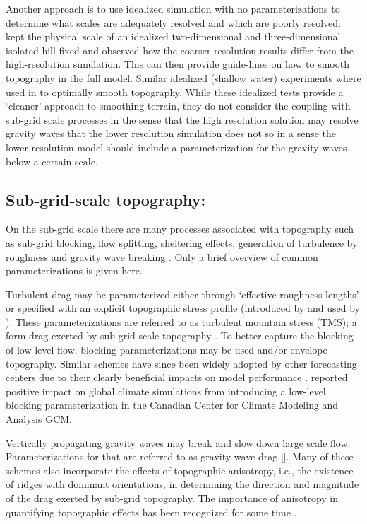\documentclass[gmd]{copernicus}
\begin{document}
Another approach is to use idealized simulation with no parameterizations to determine what scales are adequately resolved and which are poorly resolved. \cite{DB2001QJRMS} kept the physical scale of an idealized two-dimensional and three-dimensional isolated hill fixed and observed how the coarser resolution results differ from the high-resolution simulation. This can then provide guide-lines on how to smooth topography in the full model. Similar idealized (shallow water) experiments where used in \cite{RTS2006QJRMS} to optimally smooth topography. While these idealized tests provide a `cleaner' approach to smoothing terrain, they do not consider the coupling with sub-grid scale processes in the sense that the high resolution solution may resolve gravity waves that the lower resolution simulation does not so in a sense the lower resolution model should include a parameterization for the gravity waves below a certain scale.
%
\subsection{Sub-grid-scale topography: }
On the sub-grid scale there are many processes associated with topography such as sub-grid blocking, flow splitting, sheltering effects, generation of turbulence by roughness and gravity wave breaking \citep{B1990BAMS}. Only a brief overview of common parameterizations is given here.

Turbulent drag may be parameterized either through `effective roughness lengths' \citep{FP1972WJRMS} or  specified with an explicit topographic stress profile (introduced by \citet{WBH2001QJRMS} and used by \citet{BBW2004QJRMS}). These parameterizations are referred to as turbulent mountain stress (TMS); a form drag exerted by sub-grid scale topography \citep[][]{RSG2010JAS}. To better capture the blocking of low-level flow, blocking parameterizations may be used \citep[ECMWF; ][]{LM1997QJRMS} and/or envelope topography. Similar schemes have since been widely adopted by other forecasting centers due to their clearly beneficial impacts on model performance \citep[e.g.][]{WBCJ2003QJR,ZRLC2003AO,KD2005QJRMS}. \citet{SM2000QJRMS} reported positive impact on global climate simulations from introducing a low-level blocking parameterization in the Canadian Center for Climate Modeling and Analysis GCM.  

Vertically propagating gravity waves may break and slow down large scale flow. Parameterizations for that are referred to as gravity wave drag \citep[GWD; ][]{KEC2003AO} [{\color{red}{Julio: earlier reference?}}]. Many of these schemes also incorporate the effects of topographic anisotropy, i.e., the existence of ridges with dominant orientations, in determining  the direction and magnitude of the drag exerted by sub-grid topography.  The importance of anisotropy in quantifying topographic effects has been recognized for some time \citep[e.g.,][]{BP1990ECMWF,B1993JAS}.
\end{document}
